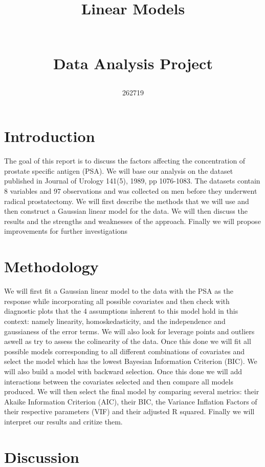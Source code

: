 \documentclass[11pt]{article}
\author{262719}
\title{\begin{huge}
Linear Models
\end{huge}\\Data Analysis Project}
\date{}
\begin{document}
\maketitle
 
\tableofcontents
\newpage

\section{Introduction}

	The goal of this report is to discuss the factors affecting the concentration of prostate specific antigen (PSA). We will base our analysis on the dataset published in Journal of Urology 141(5), 1989, pp 1076-1083. The datasets contain 8 variables and 97 observations and was collected on men before they underwent radical prostatectomy. We will first describe the methods that we will use and then construct a Gaussian linear model for the data. We will then discuss the results and the strengths and weaknesses of the approach. Finally we will propose improvements for further investigations

\section{Methodology}

	We will first fit a Gaussian linear model to the data with the PSA as the response while incorporating all possible covariates and then check with diagnostic plots that the 4 assumptions inherent to this model hold in this context: namely linearity, homoskedasticity, and the independence and gaussianess of the error terms. We will also look for leverage points and outliers aswell as try to assess the colinearity of the data.
	Once this done we will fit all possible models corresponding to all different combinations of covariates and select the model which has the lowest Bayesian Information Criterion (BIC). We will also build a model with backward selection. Once this done we will add interactions between the covariates selected and then compare all models produced. We will then select the final model by comparing several metrics: their Akaike Information Criterion (AIC), their BIC, the Variance Inflation Factors of their respective parameters (VIF) and their adjusted R squared.
	Finally we will interpret our results and critize them.

\section{Discussion}
\end{document}
